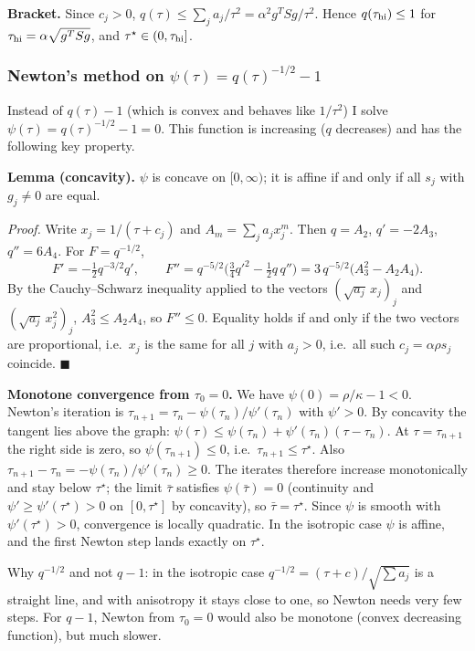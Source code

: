 \documentclass[11pt,a4paper]{article}
\begin{document}
\textbf{Bracket.} Since $c_j>0$, $q(\tau)\le\sum_ja_j/\tau^2=\alpha^2g^TSg/\tau^2$.
Hence $q(\tau_{\rm hi})\le1$ for $\tau_{\rm hi}=\alpha\sqrt{g^TSg}$, and
$\tau^\star\in(0,\tau_{\rm hi}]$.

\subsubsection*{Newton's method on $\psi(\tau)=q(\tau)^{-1/2}-1$}

Instead of $q(\tau)-1$ (which is convex and behaves like $1/\tau^2$) I solve
$\psi(\tau)=q(\tau)^{-1/2}-1=0$. This function is increasing ($q$ decreases) and has
the following key property.

\textbf{Lemma (concavity).} $\psi$ is concave on $[0,\infty)$; it is affine if and
only if all $s_j$ with $g_j\ne0$ are equal.

\emph{Proof.} Write $x_j=1/(\tau+c_j)$ and $A_m=\sum_ja_jx_j^m$. Then
$q=A_2$, $q'=-2A_3$, $q''=6A_4$. For $F=q^{-1/2}$,
\begin{equation*}
F'=-\tfrac12q^{-3/2}q',\qquad
F''=q^{-5/2}\Big(\tfrac34q'^2-\tfrac12q\,q''\Big)=3\,q^{-5/2}\big(A_3^2-A_2A_4\big).
\end{equation*}
By the Cauchy--Schwarz inequality applied to the vectors $(\sqrt{a_j}\,x_j)_j$ and
$(\sqrt{a_j}\,x_j^2)_j$, $A_3^2\le A_2A_4$, so $F''\le0$. Equality holds if and only
if the two vectors are proportional, i.e.\ $x_j$ is the same for all $j$ with
$a_j>0$, i.e.\ all such $c_j=\alpha\rho s_j$ coincide. \hfill$\blacksquare$

\textbf{Monotone convergence from $\tau_0=0$.} We have $\psi(0)=\rho/\kappa-1<0$.
Newton's iteration is $\tau_{n+1}=\tau_n-\psi(\tau_n)/\psi'(\tau_n)$ with
$\psi'>0$. By concavity the tangent lies above the graph:
$\psi(\tau)\le\psi(\tau_n)+\psi'(\tau_n)(\tau-\tau_n)$. At $\tau=\tau_{n+1}$ the right
side is zero, so $\psi(\tau_{n+1})\le0$, i.e.\ $\tau_{n+1}\le\tau^\star$. Also
$\tau_{n+1}-\tau_n=-\psi(\tau_n)/\psi'(\tau_n)\ge0$. The iterates therefore increase
monotonically and stay below $\tau^\star$; the limit $\bar\tau$ satisfies
$\psi(\bar\tau)=0$ (continuity and $\psi'\ge\psi'(\tau^\star)>0$ on $[0,\tau^\star]$
by concavity), so $\bar\tau=\tau^\star$. Since $\psi$ is smooth with
$\psi'(\tau^\star)>0$, convergence is locally quadratic. In the isotropic case
$\psi$ is affine, and the first Newton step lands exactly on $\tau^\star$.

Why $q^{-1/2}$ and not $q-1$: in the isotropic case $q^{-1/2}=(\tau+c)/\sqrt{\sum a_j}$
is a straight line, and with anisotropy it stays close to one, so Newton needs very few
steps. For $q-1$, Newton from $\tau_0=0$ would also be monotone (convex decreasing
function), but much slower.
\end{document}
